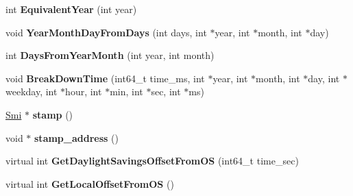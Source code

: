 \begin{DoxyCompactItemize}
\item 
int {\bfseries Equivalent\+Year} (int year)\hypertarget{classv8_1_1internal_1_1_date_cache_a0c170e47eb85e4d7ee1a991290571685}{}\label{classv8_1_1internal_1_1_date_cache_a0c170e47eb85e4d7ee1a991290571685}

\item 
void {\bfseries Year\+Month\+Day\+From\+Days} (int days, int $\ast$year, int $\ast$month, int $\ast$day)\hypertarget{classv8_1_1internal_1_1_date_cache_a5aa2a0800947deeb859a1392cb4e050d}{}\label{classv8_1_1internal_1_1_date_cache_a5aa2a0800947deeb859a1392cb4e050d}

\item 
int {\bfseries Days\+From\+Year\+Month} (int year, int month)\hypertarget{classv8_1_1internal_1_1_date_cache_a1eab5288c1b1da6639e14bf4e93509d3}{}\label{classv8_1_1internal_1_1_date_cache_a1eab5288c1b1da6639e14bf4e93509d3}

\item 
void {\bfseries Break\+Down\+Time} (int64\+\_\+t time\+\_\+ms, int $\ast$year, int $\ast$month, int $\ast$day, int $\ast$weekday, int $\ast$hour, int $\ast$min, int $\ast$sec, int $\ast$ms)\hypertarget{classv8_1_1internal_1_1_date_cache_a2584079b2ee679f52e43c1fb926c1ac7}{}\label{classv8_1_1internal_1_1_date_cache_a2584079b2ee679f52e43c1fb926c1ac7}

\item 
\hyperlink{classv8_1_1internal_1_1_smi}{Smi} $\ast$ {\bfseries stamp} ()\hypertarget{classv8_1_1internal_1_1_date_cache_a300296627a0a914acde15d6c8b92a047}{}\label{classv8_1_1internal_1_1_date_cache_a300296627a0a914acde15d6c8b92a047}

\item 
void $\ast$ {\bfseries stamp\+\_\+address} ()\hypertarget{classv8_1_1internal_1_1_date_cache_ae977601d5642d31a9b6ed482fb5bc869}{}\label{classv8_1_1internal_1_1_date_cache_ae977601d5642d31a9b6ed482fb5bc869}

\item 
virtual int {\bfseries Get\+Daylight\+Savings\+Offset\+From\+OS} (int64\+\_\+t time\+\_\+sec)\hypertarget{classv8_1_1internal_1_1_date_cache_a0414713d5ff25ceba3e28895eac1a11d}{}\label{classv8_1_1internal_1_1_date_cache_a0414713d5ff25ceba3e28895eac1a11d}

\item 
virtual int {\bfseries Get\+Local\+Offset\+From\+OS} ()\hypertarget{classv8_1_1internal_1_1_date_cache_a18150386224c00b71e53bf68a28b25f1}{}\label{classv8_1_1internal_1_1_date_cache_a18150386224c00b71e53bf68a28b25f1}

\end{DoxyCompactItemize}

